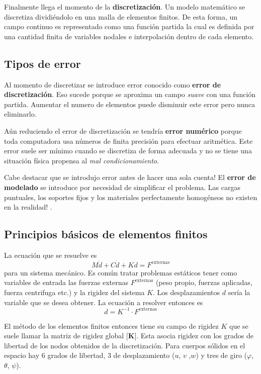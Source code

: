 \documentclass[11pt, a4paper,titlepage]{article}
\newcommand{\Mme}[1]{\boldsymbol{[}\mathbf{#1} \boldsymbol{]}}
\newcommand{\MK}{\Mme{K}}
\begin{document}
Finalmente llega el momento de la \textbf{discretización}. Un modelo matemático se discretiza dividiéndolo en una malla de elementos finitos. De esta forma, un campo continuo es representado como una función partida la cual es definida por una cantidad finita de variables nodales e interpolación dentro de cada elemento.
\vspace{-.4cm}
\subsection*{Tipos de error}
Al momento de discretizar se introduce error conocido como \textbf{error de discretización}. Eso sucede porque se aproxima un campo \textit{suave} con una función partida. Aumentar el numero de elementos puede disminuir este error pero nunca eliminarlo.

Aún reduciendo el error de discretización se tendría \textbf{error numérico} porque toda computadora usa números de finita precisión para efectuar aritmética. Este error suele ser mínimo cuando se discretiza de forma adecuada y no se tiene una situación física propensa al \textit{mal condicionamiento}.

Cabe destacar que se introdujo error antes de hacer una sola cuenta! El \textbf{error de modelado} se introduce por necesidad de simplificar el problema. Las cargas puntuales, los soportes fijos y los materiales perfectamente homogéneos no existen en la realidad! \cite{cook2007concepts}.

\subsection*{Principios básicos de elementos finitos}

La ecuación que se resuelve es
\[
M\ddot{d} + C\dot{d} + Kd = F^{\mathrm{externas}}
\]
para un sistema mecánico. Es común tratar problemas estáticos tener como variables de entrada las fuerzas externas $F^{\mathrm{externas}}$ (peso propio, fuerzas aplicadas, fuerza centrifuga etc.) y la rigidez del sistema $K$. Los desplazamientos $d$ sería la variable que se desea obtener. La ecuación a resolver entonces es
\[
d =K^{-1} \cdot F^{\mathrm{externas}}
\]

El método de los elementos finitos entonces tiene su campo de rigidez $K$ que se suele llamar la matriz de rigidez global $\MK$. Esta asocia rigidez con los grados de libertad de los nodos obtenidos de la discretización. Para cuerpos sólidos en el espacio hay 6 grados de libertad, 3 de desplazamiento ($u$, $v$ ,$w$) y tres de giro ($\varphi$, $\theta$, $\psi$). 
\end{document}
